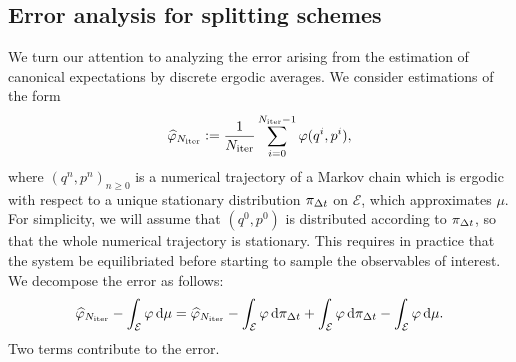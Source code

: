     \subsection{Error analysis for splitting schemes}
        We turn our attention to analyzing the error arising from the estimation of canonical expectations by discrete ergodic averages. We consider estimations of the form 
        \[\widehat{\varphi}_{N_{\mathrm{iter}}} \mathrel{\mathop:}= \frac1{N_{\mathrm{iter}}}\sum_{i=0}^{N_{\mathrm{iter}}-1}\varphi(q^i,p^i),\]
        where $(q^n,p^n)_{n\geq 0}$ is a numerical trajectory of a Markov chain which is ergodic with respect to a unique stationary distribution $\pi_{{\Delta t}}$ on $\mathcal E$, which approximates $\mu$.
        For simplicity, we will assume that $(q^0,p^0)$ is distributed according to $\pi_{\Delta t}$, so that the whole numerical trajectory is stationary. This requires in practice that the system be equilibriated before starting to sample the observables of interest. We decompose the error as follows:
        \[\widehat{\varphi}_{N_{\mathrm{iter}}}-\int_\mathcal{E}\varphi \,\mathrm{d} \mu= \widehat{\varphi}_{N_{\mathrm{iter}}} - \int_\mathcal{E}\varphi \,\mathrm{d} \pi_{{\Delta t}}+\int_\mathcal{E}\varphi\,\mathrm{d} \pi_{{\Delta t}}-\int_{\mathcal E}\varphi \,\mathrm{d} \mu.\]
        Two terms contribute to the error.
